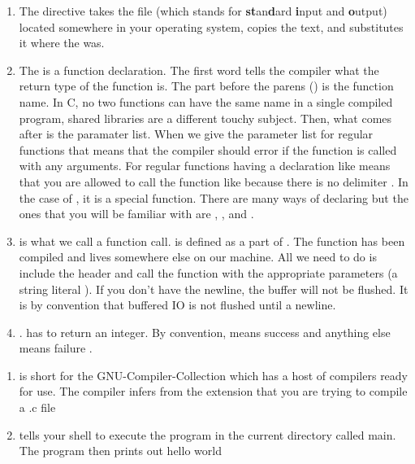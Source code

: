 \begin{enumerate}
  \item The  directive takes the file  (which stands for \textbf{st}an\textbf{d}ard \textbf{i}nput and \textbf{o}utput) located somewhere in your operating system, copies the text, and substitutes it where the  was.
  \item The  is a function declaration. The first word  tells the compiler what the return type of the function is. The part before the parens () is the function name. In C, no two functions can have the same name in a single compiled program, shared libraries are a different touchy subject. Then, what comes after is the paramater list. When we give the parameter list for regular functions  that means that the compiler should error if the function is called with any arguments. For regular functions having a declaration like  means that you are allowed to call the function like  because there is no delimiter \cite{CITATION_NEEDED}. In the case of , it is a special function. There are many ways of declaring  but the ones that you will be familiar with are , , and .
  \item {} is what we call a function call.  is defined as a part of . The function has been compiled and lives somewhere else on our machine. All we need to do is include the header and call the function with the appropriate parameters (a string literal ). If you don't have the newline, the buffer will not be flushed. It is by convention that buffered IO is not flushed until a newline. \cite{CITATION_NEEDED}
  \item {}.  has to return an integer. By convention,  means success and anything else means failure \cite{CITATION_NEEDED}.
\end{enumerate}


\begin{enumerate}
\item {} is short for the GNU-Compiler-Collection which has a host of compilers ready for use. The compiler infers from the extension that you are trying to compile a .c file
\item {} tells your shell to execute the program in the current directory called main. The program then prints out hello world
\end{enumerate}


